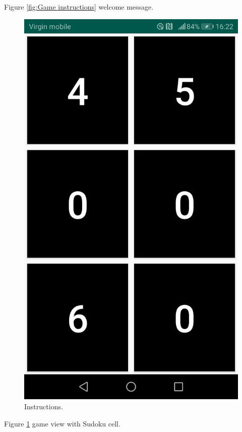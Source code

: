 \documentclass[a4paper,twoside,12pt]{book}
\begin{document}
Figure \ref{fig:Game instructions} welcome message.

\begin{figure}
\centering
  \includegraphics[width=\linewidth/2]{sudoku cell.jpg}
  \caption{Instructions.}
  \label{fig:Sudoku cell}
\end{figure}

Figure \ref{fig:Sudoku cell} game view with Sudoku cell.
\end{document}
